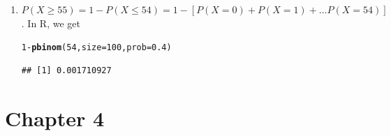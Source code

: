 \documentclass{article}\usepackage[]{graphicx}\usepackage[]{color}
\makeatletter
\newcommand{\hlnum}[1]{\textcolor[rgb]{0.686,0.059,0.569}{#1}}%
\newcommand{\hlopt}[1]{\textcolor[rgb]{0,0,0}{#1}}%
\newcommand{\hlstd}[1]{\textcolor[rgb]{0.345,0.345,0.345}{#1}}%
\newcommand{\hlkwc}[1]{\textcolor[rgb]{0.333,0.667,0.333}{#1}}%
\newcommand{\hlkwd}[1]{\textcolor[rgb]{0.737,0.353,0.396}{\textbf{#1}}}%
\newenvironment{kframe}{%
 \def\at@end@of@kframe{}%
 \ifinner\ifhmode%
  \def\at@end@of@kframe{\end{minipage}}%
  \begin{minipage}{\columnwidth}%
 \fi\fi%
 \def\FrameCommand##1{\hskip\@totalleftmargin \hskip-\fboxsep
 \colorbox{shadecolor}{##1}\hskip-\fboxsep
     \hskip-\linewidth \hskip-\@totalleftmargin \hskip\columnwidth}%
 \MakeFramed {\advance\hsize-\width
   \@totalleftmargin\z@ \linewidth\hsize
   \@setminipage}}%
 {\par\unskip\endMakeFramed%
 \at@end@of@kframe}
\newenvironment{knitrout}{}{} %
\makeatother
\begin{document}
\begin{enumerate}
\begin{enumerate}
    \item $P\left(X \ge 55\right) = 1 - P\left(X \le 54\right) = 1 - \left[P\left(X = 0\right) + P\left(X = 1\right) + \dots P\left(X = 54\right)\right]$. In R, we get
\begin{knitrout}
\color{fgcolor}\begin{kframe}
\begin{alltt}
\hlnum{1} \hlopt{-} \hlkwd{pbinom}\hlstd{(}\hlnum{54}\hlstd{,} \hlkwc{size} \hlstd{=} \hlnum{100}\hlstd{,} \hlkwc{prob}  \hlstd{=} \hlnum{0.4}\hlstd{)}
\end{alltt}
\begin{verbatim}
## [1] 0.001710927
\end{verbatim}
\end{kframe}
\end{knitrout}
  
  \end{enumerate}
  
\end{enumerate}




\section{Chapter 4}
\end{document}
